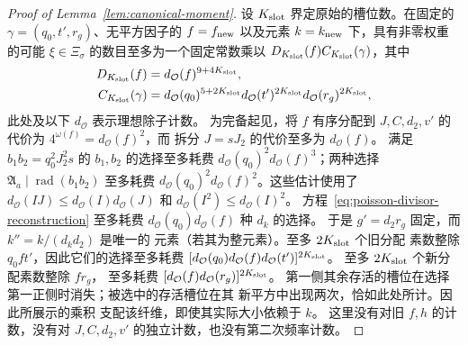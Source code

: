 \documentclass[11pt,a4paper]{article}
\numberwithin{equation}{section}
\numberwithin{figure}{section}
\theoremstyle{definition}
\theoremstyle{remark}
\begin{document}
\begin{proof}[Proof of Lemma~\ref{lem:canonical-moment}]
设 \(K_{\rm slot}\) 界定原始的槽位数。在固定的
\(\gamma=(q_0,t',r_g)\)、无平方因子的 \(f=f_{\rm new}\) 以及元素
\(k=k_{\rm new}\) 下，具有非零权重的可能 \(\xi\in\Xi_\sigma\) 的数目至多为一个固定常数乘以
\(D_{K_{\rm slot}}(f)C_{K_{\rm slot}}(\gamma)\)，其中
\begin{equation}\label{eq:inverse-new-fibre}
 \begin{split}
 D_{K_{\rm slot}}(f)&=d_{\mathcal O}(f)^{9+4K_{\rm slot}},\\
 C_{K_{\rm slot}}(\gamma)&=
 d_{\mathcal O}(q_0)^{5+2K_{\rm slot}}
 d_{\mathcal O}(t')^{2K_{\rm slot}}
 d_{\mathcal O}(r_g)^{2K_{\rm slot}},
 \end{split}
\end{equation}
此处及以下 \(d_{\mathcal O}\) 表示理想除子计数。
为完备起见，将 \(f\) 有序分配到
\(J,C,d_2,v'\) 的代价为 \(4^{\omega(f)}=d_{\mathcal O}(f)^2\)，而
拆分 \(J=sJ_2\) 的代价至多为 \(d_{\mathcal O}(f)\)。
满足 \(b_1b_2=q_0^2J_2^2s\) 的 \(b_1,b_2\) 的选择至多耗费
\(d_{\mathcal O}(q_0)^2d_{\mathcal O}(f)^3\)；两种选择
\(\mathfrak A_a\mid\operatorname{rad}(b_1b_2)\) 至多耗费
\(d_{\mathcal O}(q_0)^2d_{\mathcal O}(f)^2\)。这些估计使用了
\(d_{\mathcal O}(IJ)\le d_{\mathcal O}(I)d_{\mathcal O}(J)\) 和
\(d_{\mathcal O}(I^2)\le d_{\mathcal O}(I)^2\)。
方程~\eqref{eq:poisson-divisor-reconstruction} 至多耗费
\(d_{\mathcal O}(q_0)d_{\mathcal O}(f)\) 种 \(d_k\) 的选择。
于是 \(g'=d_2r_g\) 固定，而 \(k''=k/(d_kd_2)\) 是唯一的
元素（若其为整元素）。至多 \(2K_{\rm slot}\) 个旧分配
素数整除 \(q_0ft'\)，因此它们的选择至多耗费
\([d_{\mathcal O}(q_0)d_{\mathcal O}(f)d_{\mathcal O}(t')]^{2K_{\rm slot}}\)。
至多 \(2K_{\rm slot}\) 个新分配素数整除 \(fr_g\)，
至多耗费
\([d_{\mathcal O}(f)d_{\mathcal O}(r_g)]^{2K_{\rm slot}}\)。
第一侧其余存活的槽位在选择
第一正侧时消失；被选中的存活槽位在其
新平方中出现两次，恰如此处所计。因此所展示的乘积
支配该纤维，即使其实际大小依赖于 \(k\)。
这里没有对旧 \(f,h\) 的计数，没有对
\(J,C,d_2,v'\) 的独立计数，也没有第二次频率计数。


\end{proof}
\end{document}
